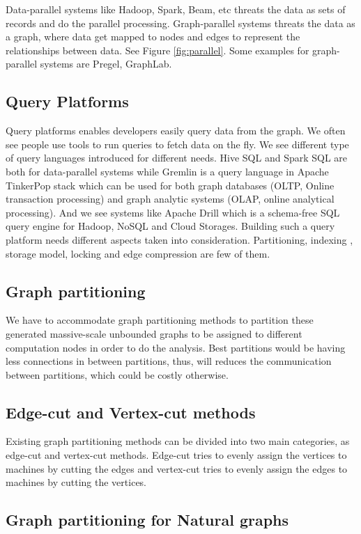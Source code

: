 \documentclass[12pt]{article}
\begin{document}
Data-parallel systems like Hadoop, Spark, Beam, etc threats the data as sets of records and do the parallel processing. Graph-parallel systems threats the data as a graph, where data get mapped to nodes and edges to represent the relationships between data. See Figure \ref{fig:parallel}. Some examples for graph-parallel systems are Pregel, GraphLab.

\subsection{Query Platforms}
Query platforms enables developers easily query data from the graph. We often see people use tools to run queries to fetch data on the fly. We see different type of query languages introduced for different needs. Hive SQL and Spark SQL are both for data-parallel systems while Gremlin is a query language in Apache TinkerPop stack which can be used for both graph databases (OLTP, Online transaction processing) and graph analytic systems (OLAP, online analytical processing). And we see systems like Apache Drill which is a schema-free SQL query engine for Hadoop, NoSQL and Cloud Storages. Building such a query platform needs different aspects taken into consideration. Partitioning, indexing , storage model, locking and edge compression are few of them. 

\subsection{Graph partitioning}

We have to accommodate graph partitioning methods to partition these generated massive-scale unbounded graphs to be assigned to  different computation nodes in order to do the analysis. Best partitions would be having less connections in between partitions, thus, will reduces the communication between partitions, which could be costly otherwise.

\subsection{Edge-cut and Vertex-cut methods}

Existing graph partitioning methods can be divided into two main categories, as edge-cut and vertex-cut methods. Edge-cut tries to evenly assign the vertices to machines by cutting the edges and vertex-cut tries to evenly assign the edges to machines by cutting the vertices. 

\subsection{Graph partitioning for Natural graphs}
\end{document}

